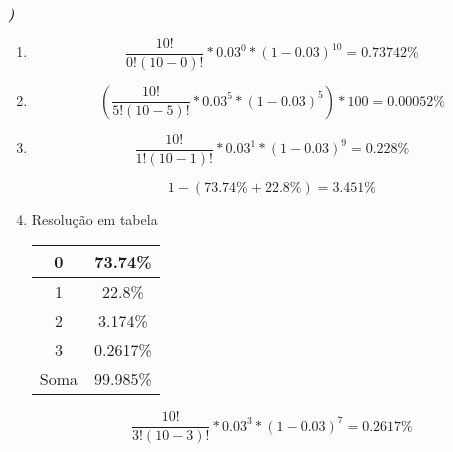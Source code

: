 \documentclass[12pt]{article}
\newcounter{instn}
\newcommand{\instnum}{\arabic{instn}}
\newcommand{\myline}[1]{
    \emph{\textbf{#1)}}
    \addtocounter{instn}{1}
}
\newenvironment{question}
 {
    \myline{\instnum} 
    }
    {
 }
\begin{document}
    \begin{question}
        \begin{enumerate}[label={\textbf{\alph*)}}]
            \item        
            \begin{equation}
                \frac{10!}{0!(10-0)!} * 0.03^{0}*(1-0.03)^{10} = 0.73742\%
            \end{equation}
            \item 
            \begin{equation}
                (\frac{10!}{5!(10-5)!} * 0.03^{5}*(1-0.03)^{5})*100 = 0.00052\%
            \end{equation}

            \item 
            \[
                \frac{10!}{1!(10-1)!} * 0.03^{1}*(1-0.03)^{9} = 0.228\%
            \]

            \begin{equation}
                1-(73.74\%+22.8\%) = 3.451\%
            \end{equation}

            \item Resolução em tabela
            
            \begin{center}
                \begin{tabular}{||c | c||} 
                \hline
                0 & 73.74\% \\ [0.5ex] 
                \hline
                1 & 22.8\% \\ 
                \hline
                2 & 3.174\% \\
                \hline
                3 & 0.2617\% \\
                \hline
                Soma & 99.985\% \\
                \hline
               \end{tabular}
            \end{center}

        \begin{equation}
            \frac{10!}{3!(10-3)!} * 0.03^{3}*(1-0.03)^{7} = 0.2617\%
        \end{equation}

        \end{enumerate}
    \end{question}

\end{document}
